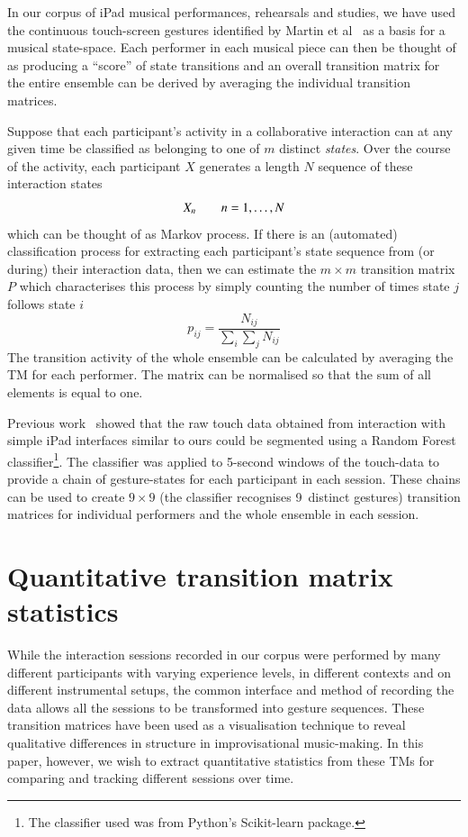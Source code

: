 \documentclass{sigchi}
\begin{document}
In our corpus of iPad musical performances, rehearsals and studies, we
have used the continuous touch-screen gestures identified by Martin et
al~\cite{Martin:2014cr} as a basis for a musical state-space.
Each performer in each musical piece can then be thought of as
producing a ``score'' of state transitions and an overall transition
matrix for the entire ensemble can be derived by averaging the
individual transition matrices.

Suppose that each participant's activity in a collaborative
interaction can at any given time be classified as belonging to one of
$m$ distinct \emph{states}. Over the course of the activity, each
participant $X$ generates a length $N$ sequence of these interaction
states
\begin{equation}
 X_n \hskip 2em n = 1, \ldots, N
\end{equation}
which can be thought of as Markov process. If there is an
(automated) classification process for extracting each participant's
state sequence from (or during) their interaction data, then we can
estimate the $m \times m$ transition matrix $P$ which characterises
this process by simply counting the number of times state $j$ follows
state $i$
\begin{equation}
  p_{ij} = \frac{N_{ij}}{\sum_i \sum_j N_{ij}}
\end{equation}
The transition activity of the whole ensemble can be calculated by
averaging the TM for each performer. The matrix can be normalised so
that the sum of all elements is equal to one.

Previous work~\cite{Martin:2015jk} showed that the raw touch data
obtained from interaction with simple iPad interfaces similar to ours
could be segmented using a Random Forest\cite{Breiman:2001kx}
classifier\footnote{The classifier used was from Python's Scikit-learn
  package\cite{scikit-learn}.}. The classifier was applied to 5-second
windows of the touch-data to provide a chain of gesture-states for
each participant in each session. These chains can be used to create
$9 \times 9$ (the classifier recognises 9~distinct gestures)
transition matrices for individual performers and the whole ensemble
in each session.

\section{Quantitative transition matrix statistics}
\label{sec:underst-impr-group}

While the interaction sessions recorded in our corpus were performed
by many different participants with varying experience levels, in
different contexts and on different instrumental setups, the common
interface and method of recording the data allows all the sessions to
be transformed into gesture sequences. These transition matrices have
been used as a visualisation technique to reveal qualitative
differences in structure in improvisational
music-making\cite{Swift:2014tya}. In this paper, however, we wish to
extract quantitative statistics from these TMs for comparing and
tracking different sessions over time.
\end{document}
